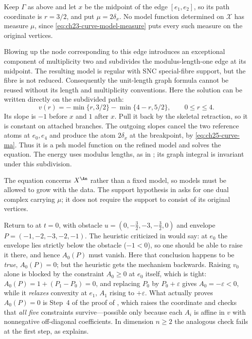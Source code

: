 \begin{example}
\label{ex:ch27-measure-off-vertices}
Keep $\Gamma$ as above and let $x$ be the midpoint of the edge
$[e_1,e_2]$, so its path coordinate is $r=3/2$, and put $\mu=2\delta_x$.
No model function determined on $\mathcal X$ has measure $\mu$, since
\eqref{eq:ch23-curve-model-measure} puts every such measure on the original
vertices.

Blowing up the node corresponding to this edge introduces an exceptional
component of multiplicity two and subdivides the modulus-length-one edge
at its midpoint.  The resulting model is regular with SNC special-fibre
support, but the fibre is not reduced.  Consequently the unit-length graph
formula cannot be reused without its length and multiplicity conventions.
Here the solution can be written directly on the subdivided path:
\[
 v(r)=-\min\{r,3/2\}-\min\{4-r,5/2\},
 \qquad 0\leq r\leq4.
\]
Its slope is $-1$ before $x$ and $1$ after $x$.  Pull it back by the
skeletal retraction, so it is constant on attached branches.
The outgoing slopes cancel the two reference atoms at $e_0,e_4$ and
produce the atom $2\delta_x$ at the breakpoint, by
\eqref{eq:ch25-curve-ma}.  Thus it is a psh model function on the
refined model and solves the equation.  The energy uses modulus lengths,
as in ; its graph integral is invariant under
this subdivision.

The equation concerns $X^{\An}$ rather than a fixed model, so models must
be allowed to grow with the data.  The support hypothesis in
 asks for one dual complex carrying $\mu$;
it does not require the support to consist of its original vertices.
\end{example}

\begin{example}
\label{ex:ch27-naive-failure-chain}
Return to  at $t=0$, with obstacle
$u=(0,-\tfrac32,-3,-\tfrac32,0)$ and envelope
$P=(-1,-2,-3,-2,-1)$.  The heuristic criticized in
 would say: at $e_0$ the envelope lies
strictly below the obstacle ($-1<0$), so one should be able to raise it
there, and hence $A_0(P)$ must vanish.  Here that conclusion happens to be
\emph{true}, $A_0(P)=0$; but the heuristic gets the mechanism backwards.
Raising $v_0$ alone is blocked by the constraint $A_0\geq0$ at $e_0$
itself, which is tight: $A_0(P)=1+(P_1-P_0)=0$, and replacing $P_0$ by
$P_0+\varepsilon$ gives $A_0=-\varepsilon<0$, while it \emph{relaxes}
convexity at $e_1$, $A_1$ rising to $+\varepsilon$.  What actually
proves $A_0(P)=0$ is Step~4 of the proof of
, which raises the coordinate and
checks that \emph{all five} constraints survive---possible only because each
$A_i$ is affine in $v$ with nonnegative off-diagonal coefficients.  In
dimension $n\geq2$ the analogous check fails at the first step, as
 explains.
\end{example}

